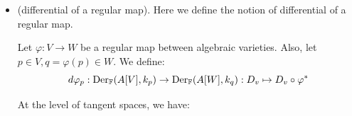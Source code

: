 \begin{itemize}
\begin{equation}
\begin{split}
        &=\{(v_1,\dots,v_{d+1})\in K^{d+1}: \sum_i D_i(f)(z_1,\dots, z_{d+1})\cdot v_i=0\}.
    \end{split}
  \end{equation}
  We see that $D_i(f)(z_1,\dots,z_{d+1})=0\Rightarrow D_i(f)\in (f)$ and $D_i(f)=0$. Since 
  $f\neq0$ and $|\bbF|=\infty$, we must have $D_i(f)\neq0$ for some $i$, so $D_i(f)(z_1,\dots, z_{d+1})\neq0$
  for some $i$. Then we conclude that 
  \begin{equation}
   \dim_K\text{Der}_{\bbF}(K,K)= \dim_{K} \mathcal{T}_{R,K} = d = \partial_{\bbF}(K) = \partial_{\bbF}(A).
  \end{equation}
  \qed
  \begin{corollary}
    If $A=\bbF[X_1,\dots,X_n]/(f_1,\dots,f_m)$, then  
    \begin{equation}
        \partial_{\bbF}(A) = \dim_K\mathcal{T}_{A,K}=n-\text{Rank}_K([D_i(f_j)]).
    \end{equation}
  \end{corollary} 

  \begin{example}
   Let $C=V(f_1,f_2), f_1 = X_1 - X_3^2, f_2 = X_2- X_3^3$. We have 
   \begin{equation}
    A[C] =\frac{\bbF[X_1,X_2,X_3]}{(f_1,f_2)}\to \bbF[X_3]:[g]\mapsto g(X_3^3,X_3^2,X_3).
   \end{equation}
   So $A[C]$ is a domain and we can define $K=\text{Frac}(A[C])$. We compute 
   \begin{equation}
    \text{Rank}_K([D_i(f_j)]) =
    \text{Rank}_K\begin{pmatrix}
       1&0& -2[X_3]\\ 0&1&-3[X_3]
    \end{pmatrix}=
    2.
   \end{equation}
   Then we conclude $\dim(V) = 3 - 2 =1$.
  \end{example}
  \item(differential of a regular map). Here we define the notion of differential of a regular map.
  \begin{definition}
    Let $\varphi:V\to W$ be a regular map between algebraic varieties. Also, let $p\in V, q = \varphi(p)\in W$. We define:
    \begin{equation}
        d\varphi_p: \text{Der}_{\mathbb{F}}(A[V],k_p)\to\text{Der}_{\mathbb{F}}(A[W],k_q):D_v\mapsto D_v\circ\varphi^*
    \end{equation}
  \end{definition}
  At the level of tangent spaces, we have:
  \begin{center}
  \end{center}


\end{itemize}
